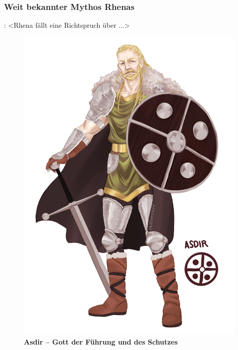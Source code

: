 \subsubsection{Weit bekannter Mythos Rhenas}:
<Rhena fällt eine Richtspruch über ...>


\begin{figure}[tbh]
	\begin{minipage}[][][b]{0.49\textwidth}
		\centering
		\vspace{0pt}
		\vspace{\baselineskip}
		\vspace{\baselineskip}
		\includegraphics[width=0.94\linewidth]{Abbildungen/Gesellschaft/Religion/asdir}
		\captionsetup{width=0.95\linewidth}
		\caption[Asdir -- Gott der Führung und des Schutzes]{\textbf{Asdir -- Gott der Führung und des Schutzes}}
		\label{fig:asdir}
	\end{minipage}
	\hfill
	\begin{minipage}{0.49\textwidth}

\end{minipage}
\end{figure}
